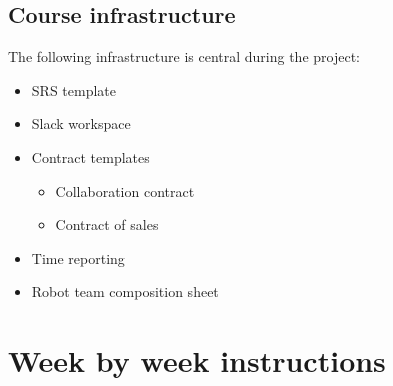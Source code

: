 \documentclass{scrreprt}
\begin{document}
\section{Course infrastructure}
The following infrastructure is central during the project:

\begin{itemize}
\item SRS template
\item Slack workspace
\item Contract templates
\begin{itemize}
\item Collaboration contract
\item Contract of sales
\end{itemize}
\item Time reporting
\item Robot team composition sheet
\end{itemize}

\chapter{Week by week instructions}
\end{document}
